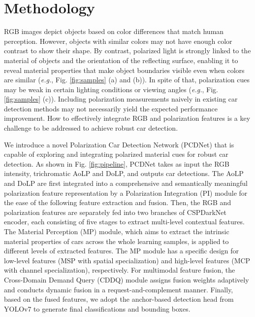 \section{Methodology}
\label{sec:methodology}
RGB images depict objects based on color differences that match human perception. However, objects with similar colors may not have enough color contrast to show their shape. By contrast, polarized light is strongly linked to the material of objects and the orientation of the reflecting surface, enabling it to reveal material properties that make object boundaries visible even when colors are similar (\textit{e.g.}, Fig. \ref{fig:samples} (a) and (b)). In spite of that, polarization cues may be weak in certain lighting conditions or viewing angles (\textit{e.g.}, Fig. \ref{fig:samples} (c)). Including polarization measurements naively in existing car detection methods may not necessarily yield the expected performance improvement. How to effectively integrate RGB and polarization features is a key challenge to be addressed to achieve robust car detection.

We introduce a novel Polarization Car Detection Network (PCDNet) that is capable of exploring and integrating polarized material cues for robust car detection. As shown in Fig. \ref{fig:pipeline}, PCDNet takes as input the RGB intensity, trichromatic AoLP and DoLP, and outputs car detections. The AoLP and DoLP are first integrated into a comprehensive and semantically meaningful polarization feature representation by a Polarization Integration (PI) module for the ease of the following feature extraction and fusion. Then, the RGB and polarization features are separately fed into two branches of CSPDarkNet \cite{wang2020cspnet} encoder, each consisting of five stages to extract multi-level contextual features. The Material Perception (MP) module, which aims to extract the intrinsic material properties of cars across the whole learning samples, is applied to different levels of extracted features. The MP module has a specific design for low-level features (MSP with spatial specialization) and high-level features (MCP with channel specialization), respectively. For multimodal feature fusion, the Cross-Domain Demand Query (CDDQ) module assigns fusion weights adaptively and conducts dynamic fusion in a request-and-complement manner. Finally, based on the fused features, we adopt the anchor-based detection head from YOLOv7 \cite{wang2022yolov7} to generate final classifications and bounding boxes.

